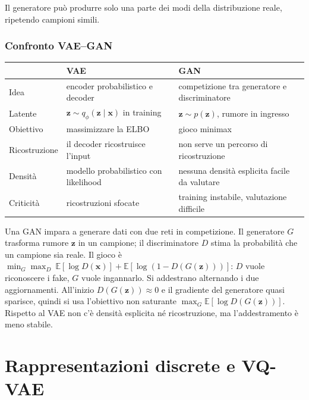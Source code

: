 \documentclass[11pt,a4paper]{article}
\providecommand{\E}{\mathbb{E}}
\begin{document}
\begin{osservazione}
Il generatore può produrre solo una parte dei modi della distribuzione reale,
ripetendo campioni simili.
\end{osservazione}

\subsubsection{Confronto VAE--GAN}
\begin{center}
\renewcommand{\arraystretch}{1.35}
\begin{tabular}{|p{2.5cm}|p{5.6cm}|p{5.6cm}|}
\hline
 & \textbf{VAE} & \textbf{GAN} \\
\hline
Idea & encoder probabilistico e decoder & competizione tra generatore e discriminatore \\
\hline
Latente & $\mathbf{z}\sim q_\phi(\mathbf{z}\mid\mathbf{x})$ in training & $\mathbf{z}\sim p(\mathbf{z})$, rumore in ingresso \\
\hline
Obiettivo & massimizzare la ELBO & gioco minimax \\
\hline
Ricostruzione & il decoder ricostruisce l'input & non serve un percorso di ricostruzione \\
\hline
Densità & modello probabilistico con likelihood & nessuna densità esplicita facile da valutare \\
\hline
Criticità & ricostruzioni sfocate & training instabile, valutazione difficile \\
\hline
\end{tabular}
\end{center}

\begin{importante}
Una GAN impara a generare dati con due reti in competizione. Il generatore
$G$ trasforma rumore $\mathbf{z}$ in un campione; il discriminatore $D$ stima la
probabilità che un campione sia reale. Il gioco è
$\min_G\max_D\ \E[\log D(\mathbf{x})]+\E[\log(1-D(G(\mathbf{z})))]$: $D$ vuole
riconoscere i fake, $G$ vuole ingannarlo. Si addestrano alternando i due
aggiornamenti. All'inizio $D(G(\mathbf{z}))\approx0$ e il gradiente del generatore
quasi sparisce, quindi si usa l'obiettivo non saturante
$\max_G\E[\log D(G(\mathbf{z}))]$. Rispetto al VAE non c'è densità esplicita né
ricostruzione, ma l'addestramento è meno stabile.
\end{importante}

\section{Rappresentazioni discrete e VQ-VAE}
\end{document}
